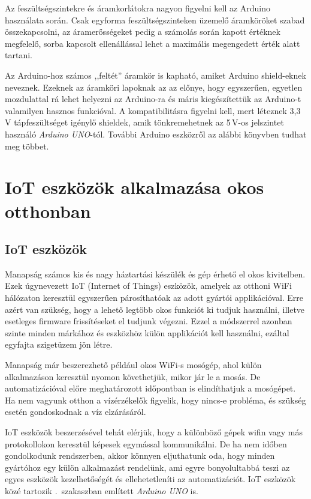 \documentclass{thesis-ekf}
\theoremstyle{definition}
\begin{document}
Az feszültségszintekre és áramkorlátokra nagyon figyelni kell az Arduino használata során. Csak egyforma feszültségszinteken üzemelő áramköröket szabad összekapcsolni, az áramerősségeket pedig a számolás során kapott értéknek megfelelő, sorba kapcsolt ellenállással lehet a maximális megengedett érték alatt tartani.

Az Arduino-hoz számos ,,feltét'' áramkör is kapható, amiket Arduino shield-eknek neveznek. Ezeknek az áramköri lapoknak az az előnye, hogy egyszerűen, egyetlen mozdulattal rá lehet helyezni az Arduino-ra és máris kiegészítettük az Arduino-t valamilyen hasznos funkcióval. A kompatibilitásra figyelni kell, mert léteznek 3,3\,V tápfeszültséget igénylő shieldek, amik tönkremehetnek az 5\,V-os jelszintet használó \emph{Arduino UNO}-tól.
További Arduino eszközről az alábbi könyvben tudhat meg többet.\cite[8--12.oldal]{arduinoBook}

\chapter{IoT eszközök alkalmazása okos otthonban}\label{smarthomeChapter}
\section{IoT eszközök}\label{iotSection}
Manapság számos kis és nagy háztartási készülék és gép érhető el okos kivitelben. Ezek úgynevezett IoT (Internet of Things) eszközök, amelyek az otthoni WiFi hálózaton keresztül egyszerűen párosíthatóak az adott gyártói applikációval. Erre azért van szükség, hogy a lehető legtöbb okos funkciót ki tudjuk használni, illetve esetleges firmware frissítéseket el tudjunk végezni. Ezzel a módszerrel azonban szinte minden márkához és eszközhöz külön applikációt kell használni, ezáltal egyfajta szigetüzem jön létre.

Manapság már beszerezhető például okos WiFi-s mosógép, ahol külön alkalmazáson keresztül nyomon követhetjük, mikor jár le a mosás. De automatizációval előre meghatározott időpontban is elindíthatjuk a mosógépet. Ha nem vagyunk otthon a vízérzékelők figyelik, hogy nincs-e probléma, és szükség esetén gondoskodnak a víz elzárásáról.

IoT eszközök beszerzésével tehát elérjük, hogy a különböző gépek wifin vagy más protokollokon keresztül képesek egymással kommunikálni. De ha nem időben gondolkodunk rendszerben, akkor könnyen eljuthatunk oda, hogy minden gyártóhoz egy külön alkalmazást rendelünk, ami egyre bonyolultabbá teszi az egyes eszközök kezelhetőségét és ellehetetleníti az automatizációt. IoT eszközök közé tartozik .~szakaszban említett \emph{Arduino UNO} is.
\end{document}

